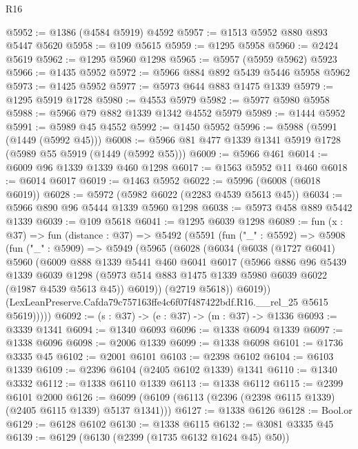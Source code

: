 \begin{lexlean}{R16}
\begin{coremodule}
@5952 := @1386 (@4584 @5919) @4592
@5957 := @1513 @5952 @880 @893 @5447 @5620
@5958 := @109 @5615
@5959 := @1295 @5958
@5960 := @2424 @5619
@5962 := @1295 @5960 @1298
@5965 := @5957 (@5959 @5962) @5923
@5966 := @1435 @5952
@5972 := @5966 @884 @892 @5439 @5446 @5958 @5962
@5973 := @1425 @5952
@5977 := @5973 @644 @883 @1475 @1339
@5979 := @1295 @5919 @1728
@5980 := @4553 @5979
@5982 := @5977 @5980 @5958
@5988 := @5966 @79 @882 @1339 @1342 @4552 @5979
@5989 := @1444 @5952
@5991 := @5989 @45 @4552
@5992 := @1450 @5952
@5996 := @5988 (@5991 (@1449 (@5992 @45)))
@6008 := @5966 @81 @477 @1339 @1341 @5919 @1728 (@5989 @55 @5919 (@1449 (@5992 @55)))
@6009 := @5966 @461
@6014 := @6009 @96 @1339 @1339 @460 @1298
@6017 := @1563 @5952 @11 @460
@6018 := @6014 @6017
@6019 := @1463 @5952
@6022 := @5996 (@6008 (@6018 @6019))
@6028 := @5972 (@5982 @6022 (@2283 @4539 @5613 @45))
@6034 := @5966 @890 @96 @5444 @1339 @5960 @1298
@6038 := @5973 @458 @889 @5442 @1339
@6039 := @109 @5618
@6041 := @1295 @6039 @1298
@6089 := fun (x : @37) =>
  fun (distance : @37) =>
  @5492
    (@5591
      (fun ("_" : @5592) =>
      @5908
        (fun ("_" : @5909) =>
        @5949
          (@5965
            (@6028
              (@6034
                (@6038
                  (@1727 @6041)
                  @5960
                  (@6009
                    @888
                    @1339
                    @5441
                    @460
                    @6041
                    @6017
                    (@5966
                      @886
                      @96
                      @5439
                      @1339
                      @6039
                      @1298
                      (@5973 @514 @883 @1475 @1339 @5980 @6039 @6022 (@1987 @4539 @5613 @45))
                      @6019))
                  (@2719 @5618))
                @6019))
            (LexLeanPreserve.Cafda79c757163ffe4c6f07f487422bdf.R16.__rel_25 @5615 @5619)))))
@6092 := (s : @37) -> (e : @37) -> (m : @37) -> @1336
@6093 := @3339 @1341
@6094 := @1340 @6093
@6096 := @1338 @6094 @1339
@6097 := @1338 @6096
@6098 := @2006 @1339
@6099 := @1338 @6098
@6101 := @1736 @3335 @45
@6102 := @2001 @6101
@6103 := @2398 @6102
@6104 := @6103 @1339
@6109 := @2396 @6104 (@2405 @6102 @1339) @1341
@6110 := @1340 @3332
@6112 := @1338 @6110 @1339
@6113 := @1338 @6112
@6115 := @2399 @6101 @2000
@6126 := @6099 (@6109 (@6113 (@2396 (@2398 @6115 @1339) (@2405 @6115 @1339) @5137 @1341)))
@6127 := @1338 @6126
@6128 := Bool.or
@6129 := @6128 @6102
@6130 := @1338 @6115
@6132 := @3081 @3335 @45
@6139 := @6129 (@6130 (@2399 (@1735 @6132 @1624 @45) @50))

\end{coremodule}
\end{lexlean}
